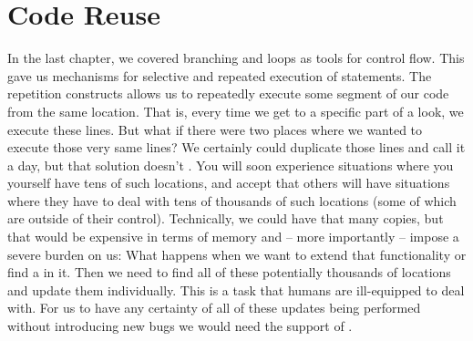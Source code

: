 \chapter{Code Reuse}
\label{sec:func}

In the last chapter, we covered branching and loops as tools for control flow. This gave us mechanisms for selective and repeated execution of statements. The repetition constructs allows us to repeatedly execute some segment of our code from the same location. That is, every time we get to a specific part of a look, we execute these lines. But what if there were two places where we wanted to execute those very same lines? We certainly could duplicate those lines and call it a day, but that solution doesn't . You will soon experience situations where you yourself have tens of such locations, and accept that others will have situations where they have to deal with tens of thousands of such locations (some of which are outside of their control). Technically, we could have that many copies, but that would be expensive in terms of memory and -- more importantly -- impose a severe  burden on us: What happens when we want to extend that functionality or find a  in it. Then we need to find all of these potentially thousands of locations and update them individually. This is a task that humans are ill-equipped to deal with. For us to have any certainty of all of these updates being performed without introducing new bugs we would need the support of .


